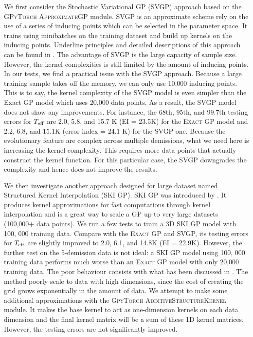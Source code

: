 We first consider the Stochastic Variational GP (SVGP) approach based on the \textsc{GPyTorch ApproximateGP} module. 
SVGP is an approximate scheme rely on the use of a series of inducing points which can be selected in the parameter space. It trains using minibatches on the training dataset and build up kernels on the inducing points. Underline principles and detailed descriptions of this approach can be found in \citet{hensman2015scalable}. The advantage of SVGP is the large capacity of sample size. However, the kernel complexities is still limited by the amount of inducing points. 
%
In our tests, we find a practical issue with the SVGP approach. Because a large training sample takes off the memory, we can only use 10,000 inducing points. This is to say, the kernel complexity of the SVGP model is even simpler than the Exact GP model which uses 20,000 data points. As a result, the SVGP model does not show any improvements. For instance, the 68th, 95th, and 99.7th testing errors for $T_{\rm eff}$ are 2.0, 5.8, and 15.7 K (EI = 23.5K) for the \textsc{Exact GP} model and 2.2, 6.8, and 15.1K (error index = 24.1 K) for the SVGP one. Because the evolutionary feature are complex across multiple demissions, what we need here is increasing the kernel complexity. This requires more data points that actually construct the kernel function. For this particular case, the SVGP downgrades the complexity and hence does not improve the results.   

We then investigate another approach designed for large dataset named Structured Kernel Interpolation (SKI GP). SKI GP was introduced by \citet{wilson2015kernel}. It produces kernel approximations for fast computations through kernel interpolation and is a great way to scale a GP up to very large datasets (100,000+ data points).
We run a few tests to train a 3D SKI GP model with 100, 000 training data. Compare with the \textsc{Exact GP} and SVGP, its testing errors for $T_{\rm eff}$ are slightly improved to 2.0, 6.1, and 14.8K (EI = 22.9K). However, the further test on the 5-demission data is not ideal: a SKI GP model using 100, 000 training data performs much worse than an \textsc{Exact GP} model with only 20,000 training data. The poor behaviour consists with what has been discussed in \citet{wilson2015kernel}. The method poorly scale to data with high dimensions, since the cost of creating the grid grows exponentially in the amount of data. We attempt to make some additional approximations with the \textsc{GpyTorch AdditiveStructureKernel} module. It makes the base kernel to act as one-dimension kernels on each data dimension and the final kernel matrix will be a sum of these 1D kernel matrices. However, the testing errors are not significantly improved.

